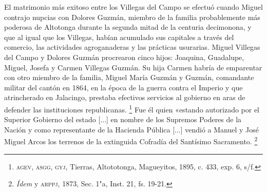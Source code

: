 \documentclass[14pt,twoside,final]{extbook} %
\let\oldfootnote\footnote
\renewcommand\footnote[1]{%
\oldfootnote{\hspace{1mm}#1}}
\begin{document}
El matrimonio más exitoso entre los Villegas del Campo se efectuó cuando Miguel contrajo nupcias con Dolores Guzmán, miembro de la familia probablemente más poderosa de Altotonga durante la segunda mitad de la centuria decimonona, y que al igual que los Villegas, habían acumulado sus capitales a través del comercio, las actividades agroganaderas y las prácticas usurarias. Miguel Villegas del Campo y Dolores Guzmán procrearon cinco hijos: Joaquina, Guadalupe, Miguel, Josefa y Carmen Villegas Guzmán. Su hija Carmen habría de emparentar con otro miembro de la familia, Miguel María Guzmán y Guzmán, comandante militar del cantón en 1864, en la época de la guerra contra el Imperio y que atrincherado en Jalacingo, prestaba efectivos servicios al gobierno en aras de defender las instituciones republicanas.\footnote{\textsc{agev, asgg, gyj}, Tierras, Altototonga, Magueyitos, 1895, c. 433, exp. 6, s/f.} Fue él quien «estando autorizado por el Superior Gobierno del estado [...] en nombre de los Supremos Poderes de la Nación y como representante de la Hacienda Pública [...] vendió a Manuel y José Miguel Arcos los terrenos de la extinguida Cofradía del Santísimo Sacramento.\footnote{\emph{Ídem} y \textsc{arppj}, 1873, Sec. 1"a, Inst. 21, fs. 19-21.}
\end{document}
